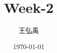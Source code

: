 \documentclass[12pt, a4paper]{article}
\title{\textbf{Week-2}}
\author{王弘禹}
\date\today
\begin{document}
\begin{CJK*}{UTF8}{bsmi}
\linespread{1.5}
\maketitle
\newcommand{\st}[1]{\section*{#1}}
\newcommand{\sst}[1]{\subsection*{#1}}
\newcommand{\ssst}[1]{\subsubsection*{#1}}
\newcommand{\dsp}{\displaystyle}
\newcommand{\dx}{\,dx}
\newcommand{\dphi}{\,d\phi}
\newcommand{\dtheta}{\,d\theta}
\newcommand{\dy}{\,dy}
\newcommand{\dz}{\,dz}
\newcommand{\dr}{\,dr}
\newcommand{\drho}{\,d\rho}
\newcommand{\tb}{\textbf}


\end{CJK*}
\end{document}
